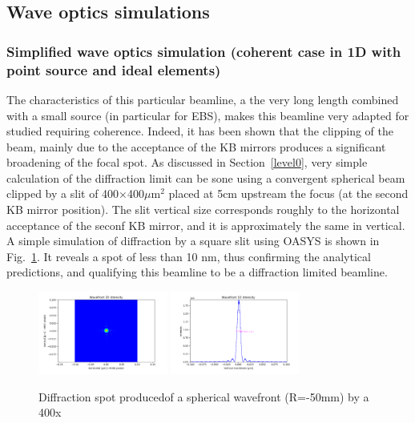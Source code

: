 \documentclass{iucr}              %
\begin{document}

\subsection{Wave optics simulations}
\label{level2}

 
\subsubsection{Simplified wave optics simulation (coherent case in 1D with point source and ideal elements)}

The characteristics of this particular beamline, a the very long length combined with a small source (in particular for EBS), makes this beamline very adapted for studied requiring coherence. Indeed, it has been shown that the clipping of the beam, mainly due to the acceptance of the KB mirrors produces a significant broadening of the focal spot.  As discussed in Section~\ref{level0}, very simple calculation of the diffraction limit can be sone using a convergent spherical beam clipped by a slit of 400$\times$400$ \mu$m$^2$ placed at 5cm upstream the focus (at the second KB mirror position). The slit vertical size corresponds roughly to the horizontal acceptance of the seconf KB mirror, and it is approximately the same in vertical. A simple simulation of diffraction by a square slit using OASYS is shown in Fig.~\ref{wofry400um}. It reveals a spot of less than 10 nm, thus confirming the analytical predictions, and qualifying this beamline to be a diffraction limited beamline.  

\begin{figure}
\label{wofry400um}
\centering
\includegraphics[width=4.25cm]{GRAPHICS/wofry400umslit.png}
\includegraphics[width=4.25cm]{GRAPHICS/wofry400umprofile.png}
\caption{Diffraction spot producedof a spherical wavefront (R=-50mm) by a 400x}
\end{figure}
\end{document}
